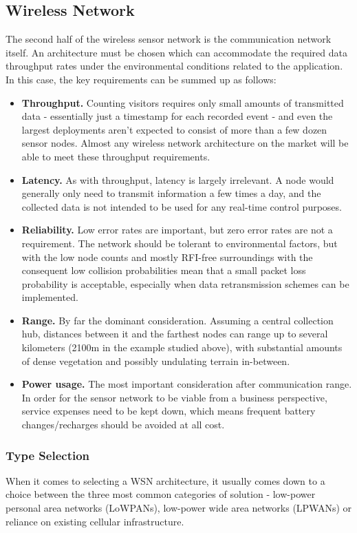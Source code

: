 \documentclass[10pt,nocopyrightspace]{ewsn-proc}
\begin{document}
\subsection{Wireless Network}
The second half of the wireless sensor network is the communication network itself. An architecture must be chosen which can accommodate the required data throughput rates under the environmental conditions related to the application. In this case, the key requirements can be summed up as follows:
\begin{itemize}
\item \textbf{Throughput.} Counting visitors requires only small amounts of transmitted data - essentially just a timestamp for each recorded event - and even the largest deployments aren’t expected to consist of more than a few dozen sensor nodes. Almost any wireless network architecture on the market will be able to meet these throughput requirements.
\item \textbf{Latency.} As with throughput, latency is largely irrelevant. A node would generally only need to transmit information a few times a day, and the collected data is not intended to be used for any real-time control purposes.
\item \textbf{Reliability.} Low error rates are important, but zero error rates are not a requirement. The network should be tolerant to environmental factors, but with the low node counts and mostly RFI-free surroundings with the consequent low collision probabilities mean that a small packet loss probability is acceptable, especially when data retransmission schemes can be implemented.
\item \textbf{Range.} By far the dominant consideration. Assuming a central collection hub, distances between it and the farthest nodes can range up to several kilometers (2100m in the example studied above), with substantial amounts of dense vegetation and possibly undulating terrain in-between. 
\item \textbf{Power usage.} The most important consideration after communication range. In order for the sensor network to be viable from a business perspective, service expenses need to be kept down, which means frequent battery changes/recharges should be avoided at all cost. 
\end{itemize}

\subsubsection{Type Selection}
When it comes to selecting a WSN architecture, it usually comes down to a choice between the three most common categories of solution - low-power personal area networks (LoWPANs), low-power wide area networks (LPWANs) or reliance on existing cellular infrastructure.
\end{document}
